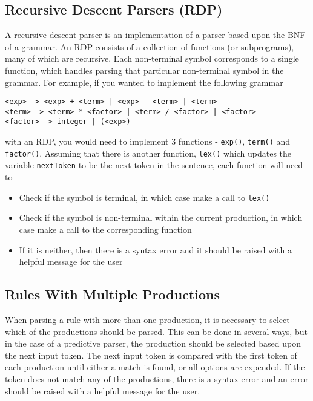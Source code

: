 \subsection*{Recursive Descent Parsers (RDP)}

A recursive descent parser is an implementation of a parser based upon the BNF of a grammar. An RDP consists of a
 collection of functions (or subprograms), many of which are recursive. Each non-terminal symbol corresponds to a
 single function, which handles parsing that particular non-terminal symbol in the grammar. For example, if you wanted
 to implement the following grammar
\begin{verbatim}
<exp> -> <exp> + <term> | <exp> - <term> | <term>
<term> -> <term> * <factor> | <term> / <factor> | <factor>
<factor> -> integer | (<exp>)
\end{verbatim}
with an RDP, you would need to implement 3 functions - \verb`exp()`, \verb`term()` and \verb`factor()`. Assuming that
 there is another function, \verb`lex()` which updates the variable \verb`nextToken` to be the next token in the
 sentence, each function will need to
\begin{itemize}
  \item Check if the symbol is terminal, in which case make a call to \verb`lex()`
  \item Check if the symbol is non-terminal within the current production, in which case make a call to the corresponding
   function
  \item If it is neither, then there is a syntax error and it should be raised with a helpful message for the user
\end{itemize}

\subsection*{Rules With Multiple Productions}

When parsing a rule with more than one production, it is necessary to select which of the productions should be parsed.
 This can be done in several ways, but in the case of a predictive parser, the production should be selected based upon
 the next input token. The next input token is compared with the first token of each production until either a match is
 found, or all options are expended. If the token does not match any of the productions, there is a syntax error and an
 error should be raised with a helpful message for the user.
